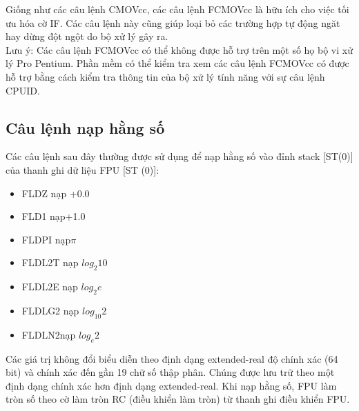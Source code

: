 		Giống như các câu lệnh CMOVcc, các câu lệnh FCMOVcc là hữu ích cho việc tối ưu hóa cờ IF. Các câu lệnh này cũng giúp loại bỏ các trường hợp tự động ngăt hay dừng đột ngột do bộ xử lý gây ra.\\
		
	Lưu ý: Các câu lệnh FCMOVcc có thể không được hỗ trợ trên một số họ bộ vi xử lý Pro Pentium. Phần mềm có thể kiểm tra xem các câu lệnh FCMOVcc có được hỗ trợ bằng cách kiểm tra thông tin của bộ xử lý tính năng với sự câu lệnh CPUID.

		\subsection*{Câu lệnh nạp hằng số}
		Các câu lệnh sau đây thường được sử dụng để nạp hằng số vào đỉnh stack [ST(0)] của thanh ghi dữ liệu FPU [ST (0)]:
		\begin{itemize}
			\renewcommand{\labelitemi}{}
			\item FLDZ nạp +0.0
			\item FLD1 nạp+1.0
			\item FLDPI nạp$\pi$
			\item FLDL2T nạp $log_{2}10$
			\item FLDL2E nạp $log_{2}e$
			\item FLDLG2 nạp $log_{10}2$
			\item FLDLN2nạp $log_{e}2$
		\end{itemize}					

		Các giá trị không đổi biểu diễn theo định dạng extended-real độ chính xác (64 bit) và chính xác đến gần 19 chữ số thập phân. Chúng được lưu trữ theo một định dạng chính xác hơn định dạng extended-real. Khi nạp hằng số, FPU làm tròn số theo cờ làm tròn RC (điều khiển làm tròn) từ thanh ghi điều khiển FPU. 

